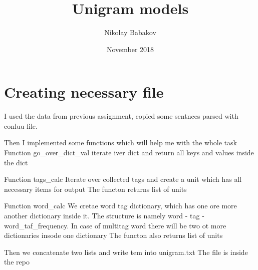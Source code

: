 \documentclass{article}
\title{Unigram models}
\author{Nikolay Babakov }
\date{November 2018}
\begin{document}
\maketitle

\section{Creating necessary file}
I used the data from previous assignment, copied some sentnces parsed with conluu file. 

Then I implemented some functions which will help me with the whole task
Function go_over_dict_val 
iterate iver dict and return all keys and values inside the dict

Function tags_calc
Iterate over collected tags and create a unit which has all necessary items for output
The functon returns list of units

Function word_calc
We cretae word tag dictionary, which has one ore more another dictionary inside it. The structure is namely word - tag - word_taf_frequency. In case of multitag word there will be two ot more dictionaries insode one dictionary
The functon also returns list of units

Then we concatenate two lists and write tem into unigram.txt
The file is inside the repo
\end{document}
